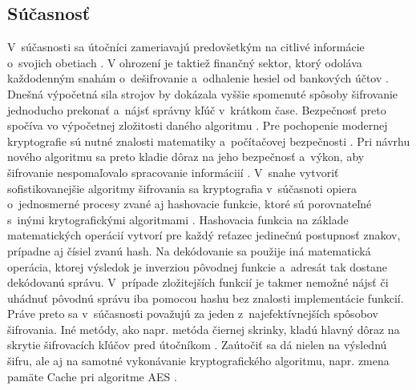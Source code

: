 \documentclass[11pt,a4paper]{article}
\begin{document}
\subsection{Súčasnosť}
V~súčasnosti sa útočníci zameriavajú predovšetkým na citlivé informácie o~svojich obetiach \cite{SecWorld}. V ohrození je taktiež finančný sektor, ktorý odoláva každodenným snahám o~dešifrovanie a~odhalenie hesiel od bankových účtov \cite{CryptoMagazine2}. Dnešná výpočetná sila strojov by dokázala vyššie spomenuté spôsoby šifrovanie jednoducho prekonať a~nájsť správny kľúč v~krátkom čase. Bezpečnosť preto spočíva vo výpočetnej zložitosti daného algoritmu \cite{ZakKryAlg}. Pre pochopenie modernej kryptografie sú nutné znalosti matematiky a~počítačovej bezpečnosti  \cite{HandOfInf}. Pri návrhu nového algoritmu sa preto kladie dôraz na jeho bezpečnosť a~výkon, aby šifrovanie nespomaľovalo spracovanie informáciií \cite{BakPrac2}. V~snahe vytvoriť sofistikovanejšie algoritmy šifrovania sa kryptografia v~súčasnoti opiera o~jednosmerné procesy zvané aj hashovacie funkcie, ktoré sú porovnateľné s~inými krytografickými algoritmami \cite{Krypt}. Hashovacia funkcia na základe matematických operácií vytvorí pre každý reťazec jedinečnú postupnosť znakov, prípadne aj čísiel zvanú hash. Na dekódovanie sa použije iná matematická operácia, ktorej výsledok je inverziou pôvodnej funkcie a~adresát tak dostane dekódovanú správu. V~prípade zložitejších funkcií je takmer nemožné nájsť či uhádnuť pôvodnú správu iba pomocou hashu bez znalosti implementácie funkcií. Práve preto sa v~súčasnosti považujú za jeden z~najefektívnejších spôsobov šifrovania.
Iné metódy, ako napr. metóda čiernej skrinky, kladú hlavný dôraz na skrytie šifrovacích kľúčov pred útočníkom \cite{CryptoMagazine}. Zaútočiť sa dá nielen na výslednú šifru, ale aj na samotné vykonávanie kryptografického algoritmu, napr. zmena pamäte Cache pri algoritme AES \cite{BakPrac1}.
\newpage

\end{document}
